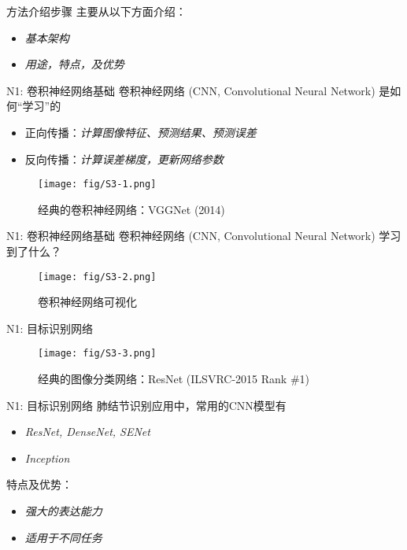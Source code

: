 \documentclass[10pt]{beamer}
\begin{document}
\begin{frame}{方法介绍步骤}
  主要从以下方面介绍：
  \begin{itemize}
    \item \textit{基本架构}
    \item \textit{用途，特点，及优势}
  \end{itemize}
\end{frame}

\begin{frame}{N1: 卷积神经网络基础}
  卷积神经网络 (CNN, Convolutional Neural Network) 是如何“学习”的
  \begin{itemize}
    \item 正向传播：\textit{计算图像特征、预测结果、预测误差}
    \item 反向传播：\textit{计算误差梯度，更新网络参数}
  \end{itemize}
  \begin{figure}[htbp]
    \centering
    \texttt{[image: fig/S3-1.png]}
    \caption{经典的卷积神经网络：VGGNet (2014)}
  \end{figure}
\end{frame}

\begin{frame}{N1: 卷积神经网络基础}
  卷积神经网络 (CNN, Convolutional Neural Network) 学习到了什么？
  \begin{figure}[H]
    \centering
    \texttt{[image: fig/S3-2.png]}
    \caption{卷积神经网络可视化}
  \end{figure}
\end{frame}

\begin{frame}{N1: 目标识别网络}
  \begin{figure}[H]
    \centering
    \texttt{[image: fig/S3-3.png]}
    \caption{经典的图像分类网络：ResNet (ILSVRC-2015 Rank \#1)}
  \end{figure}
\end{frame}

\begin{frame}{N1: 目标识别网络}
  肺结节识别应用中，常用的CNN模型有
  \begin{itemize}
    \item \textit{ResNet, DenseNet, SENet}
    \item \textit{Inception}
  \end{itemize}

  特点及优势：
  \begin{itemize}
    \item \textit{强大的表达能力}
    \item \textit{适用于不同任务}
  \end{itemize}
\end{frame}
\end{document}
